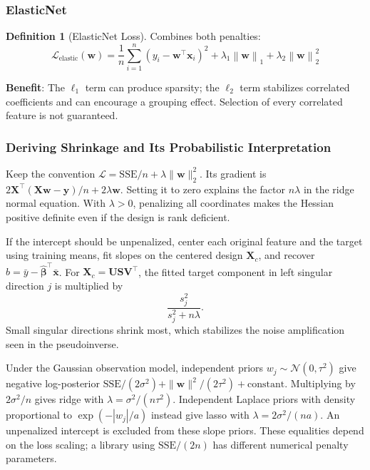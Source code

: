 \documentclass[11pt,twoside]{article}
\numberwithin{equation}{section}
\newcommand{\vect}[1]{\bm{#1}}
\newcommand{\mat}[1]{\bm{#1}}
\newcommand{\norm}[1]{\left\lVert#1\right\rVert}
\newcommand{\Loss}{\mathcal{L}}
\theoremstyle{plain}
\theoremstyle{definition}
\newtheorem{definition}[theorem]{Definition}
\theoremstyle{remark}
\begin{document}
\subsubsection{ElasticNet}

\begin{definition}[ElasticNet Loss]
Combines both penalties:
\[
\Loss_{\text{elastic}}(\vect{w}) = \frac{1}{n}\sum_{i=1}^n (y_i - \vect{w}^\top\vect{x}_i)^2 + \lambda_1 \norm{\vect{w}}_1 + \lambda_2 \norm{\vect{w}}_2^2
\]
\end{definition}

\textbf{Benefit}: The $\ell_1$ term can produce sparsity; the $\ell_2$ term stabilizes correlated coefficients and can encourage a grouping effect. Selection of every correlated feature is not guaranteed.

\subsubsection{Deriving Shrinkage and Its Probabilistic Interpretation}
\label{sec:regularization-derivation}
Keep the convention $\Loss=\mathrm{SSE}/n+\lambda\|\vect w\|_2^2$. Its gradient is $2\mat X^\top(\mat X\vect w-\vect y)/n+2\lambda\vect w$. Setting it to zero explains the factor $n\lambda$ in the ridge normal equation. With $\lambda>0$, penalizing all coordinates makes the Hessian positive definite even if the design is rank deficient.

If the intercept should be unpenalized, center each original feature and the target using training means, fit slopes on the centered design $\mat X_c$, and recover $b=\bar y-\hat{\vect\beta}^{\top}\bar{\vect x}$. For $\mat X_c=\mat U\mat S\mat V^\top$, the fitted target component in left singular direction $j$ is multiplied by
\[
\frac{s_j^2}{s_j^2+n\lambda}.
\]
Small singular directions shrink most, which stabilizes the noise amplification seen in the pseudoinverse.

Under the Gaussian observation model, independent priors $w_j\sim\mathcal N(0,\tau^2)$ give negative log-posterior $\mathrm{SSE}/(2\sigma^2)+\|\vect w\|^2/(2\tau^2)+\text{constant}$. Multiplying by $2\sigma^2/n$ gives ridge with $\lambda=\sigma^2/(n\tau^2)$. Independent Laplace priors with density proportional to $\exp(-|w_j|/a)$ instead give lasso with $\lambda=2\sigma^2/(na)$. An unpenalized intercept is excluded from these slope priors. These equalities depend on the loss scaling; a library using $\mathrm{SSE}/(2n)$ has different numerical penalty parameters.
\end{document}

